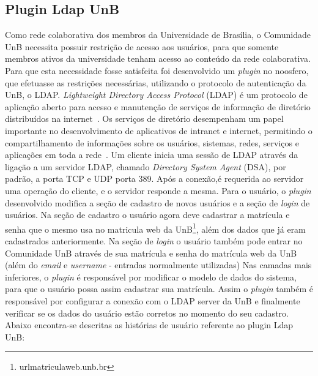 \subsection{Plugin Ldap UnB}
%
Como rede colaborativa dos membros da Universidade de Brasília, o Comunidade UnB 
necessita possuir restrição de acesso aos usuários, para que somente membros ativos 
da universidade tenham acesso ao conteúdo da rede colaborativa. 
%
Para que esta necessidade fosse satisfeita foi desenvolvido um \textit{plugin} no noosfero, que efetuasse as restrições necessárias, utilizando o protocolo de autenticação da UnB, o LDAP.
%
\textit{Lightweight Directory Access Protocol} (LDAP) é um protocolo de aplicação 
aberto para acesso e manutenção  de serviços de informação de diretório distribuídos 
na internet~\cite{sermersheim2006}.
%
Os serviços de diretório desempenham um papel importante no desenvolvimento de aplicativos 
de intranet e internet, permitindo o compartilhamento de informações sobre os usuários, 
sistemas, redes, serviços e aplicações em toda a rede~\cite{oracle2000}.
%
Um cliente inicia uma sessão de LDAP através da ligação a um servidor LDAP, chamado 
\textit{Directory System Agent} (DSA), por padrão, a porta TCP e UDP porta 389. Após 
a conexão,é requerida ao servidor uma operação do cliente, e o servidor responde a 
mesma. 
%
Para o usuário, o \textit{plugin} desenvolvido modifica a seção de cadastro de novos usuários e a seção de \textit{login} de usuários. Na seção de cadastro o usuário agora deve cadastrar a matrícula e senha que o mesmo usa no matricula web da UnB\footnote{url{matriculaweb.unb.br}}, além dos dados que já eram cadastrados anteriormente. Na seção de \textit{login} o usuário também pode entrar no Comunidade UnB através de sua matrícula e senha do matrícula web da UnB (além do \textit{email} e \textit{username} 
- entradas normalmente utilizadas)
%
Nas camadas mais inferiores, o \textit{plugin} é responsável por modificar o modelo de dados do sistema, para que o usuário possa assim cadastrar sua matrícula. Assim o \textit{plugin} também é responsável por configurar a conexão com o LDAP server da UnB e finalmente verificar se os dados do usuário estão corretos no momento do seu cadastro. Abaixo encontra-se descritas as histórias de usuário referente ao {plugin} Ldap UnB:
